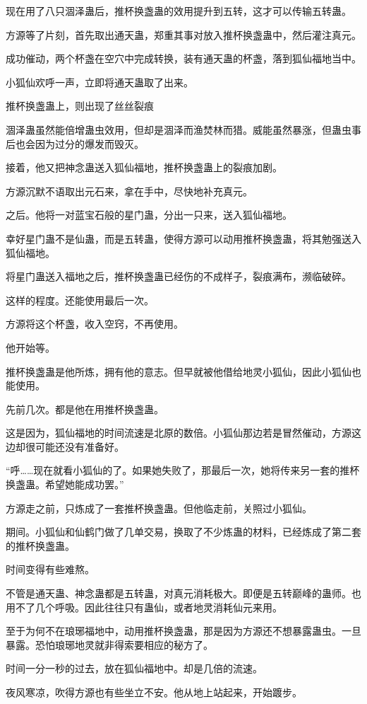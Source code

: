 \begin{this_body}
现在用了八只涸泽蛊后，推杯换盏蛊的效用提升到五转，这才可以传输五转蛊。

方源等了片刻，首先取出通天蛊，郑重其事对放入推杯换盏蛊中，然后灌注真元。

成功催动，两个杯盏在空穴中完成转换，装有通天蛊的杯盏，落到狐仙福地当中。

小狐仙欢呼一声，立即将通天蛊取了出来。

推杯换盏蛊上，则出现了丝丝裂痕

涸泽蛊虽然能倍增蛊虫效用，但却是涸泽而渔焚林而猎。威能虽然暴涨，但蛊虫事后也会因为过分的爆发而毁灭。

接着，他又把神念蛊送入狐仙福地，推杯换盏蛊上的裂痕加剧。

方源沉默不语取出元石来，拿在手中，尽快地补充真元。

之后。他将一对蓝宝石般的星门蛊，分出一只来，送入狐仙福地。

幸好星门蛊不是仙蛊，而是五转蛊，使得方源可以动用推杯换盏蛊，将其勉强送入狐仙福地。

将星门蛊送入福地之后，推杯换盏蛊已经伤的不成样子，裂痕满布，濒临破碎。

这样的程度。还能使用最后一次。

方源将这个杯盏，收入空窍，不再使用。

他开始等。

推杯换盏蛊是他所炼，拥有他的意志。但早就被他借给地灵小狐仙，因此小狐仙也能使用。

先前几次。都是他在用推杯换盏蛊。

这是因为，狐仙福地的时间流速是北原的数倍。小狐仙那边若是冒然催动，方源这边却很可能还没有准备好。

“呼……现在就看小狐仙的了。如果她失败了，那最后一次，她将传来另一套的推杯换盏蛊。希望她能成功罢。”

方源走之前，只炼成了一套推杯换盏蛊。但他临走前，关照过小狐仙。

期间。小狐仙和仙鹤门做了几单交易，换取了不少炼蛊的材料，已经炼成了第二套的推杯换盏蛊。

时间变得有些难熬。

不管是通天蛊、神念蛊都是五转蛊，对真元消耗极大。即便是五转巅峰的蛊师。也用不了几个呼吸。因此往往只有蛊仙，或者地灵消耗仙元来用。

至于为何不在琅琊福地中，动用推杯换盏蛊，那是因为方源还不想暴露蛊虫。一旦暴露。恐怕琅琊地灵就非得索要相应的秘方了。

时间一分一秒的过去，放在狐仙福地中。却是几倍的流速。

夜风寒凉，吹得方源也有些坐立不安。他从地上站起来，开始踱步。


\end{this_body}
